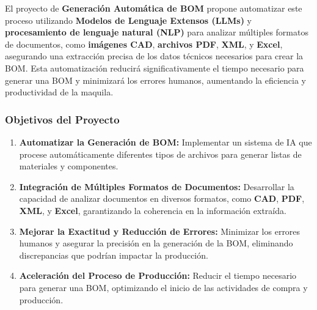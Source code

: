 \documentclass[
  10pt,
  letterpaper,
]{book}
\providecommand{\tightlist}{%
  \setlength{\itemsep}{0pt}\setlength{\parskip}{0pt}}\usepackage{longtable,booktabs,array}
\begin{document}
El proyecto de \textbf{Generación Automática de BOM} propone automatizar
este proceso utilizando \textbf{Modelos de Lenguaje Extensos (LLMs)} y
\textbf{procesamiento de lenguaje natural (NLP)} para analizar múltiples
formatos de documentos, como \textbf{imágenes CAD}, \textbf{archivos
PDF}, \textbf{XML}, y \textbf{Excel}, asegurando una extracción precisa
de los datos técnicos necesarios para crear la BOM. Esta automatización
reducirá significativamente el tiempo necesario para generar una BOM y
minimizará los errores humanos, aumentando la eficiencia y productividad
de la maquila.

\subsubsection{Objetivos del Proyecto}\label{objetivos-del-proyecto}

\begin{enumerate}
\def\labelenumi{\arabic{enumi}.}
\tightlist
\item
  \textbf{Automatizar la Generación de BOM:} Implementar un sistema de
  IA que procese automáticamente diferentes tipos de archivos para
  generar listas de materiales y componentes.
\item
  \textbf{Integración de Múltiples Formatos de Documentos:} Desarrollar
  la capacidad de analizar documentos en diversos formatos, como
  \textbf{CAD}, \textbf{PDF}, \textbf{XML}, y \textbf{Excel},
  garantizando la coherencia en la información extraída.
\item
  \textbf{Mejorar la Exactitud y Reducción de Errores:} Minimizar los
  errores humanos y asegurar la precisión en la generación de la BOM,
  eliminando discrepancias que podrían impactar la producción.
\item
  \textbf{Aceleración del Proceso de Producción:} Reducir el tiempo
  necesario para generar una BOM, optimizando el inicio de las
  actividades de compra y producción.
\end{enumerate}
\end{document}
